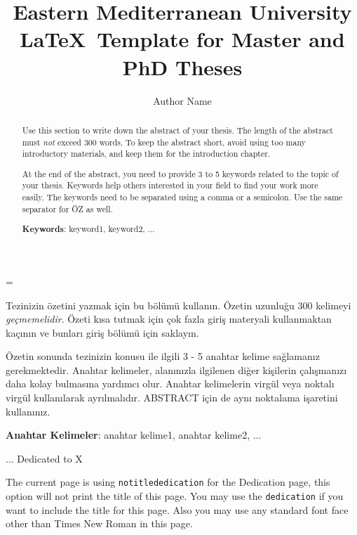 \documentclass[a4paper,12pt,oneside]{report}
\title{Eastern Mediterranean University \LaTeX~Template for Master and PhD Theses}
\author{Author Name}
\begin{document}

\emergencystretch=\maxdimen
{}

\makethesistitle 
\makeapprovalpage

\begin{abstract}
Use this section to write down the abstract of your thesis. The length of the abstract must \textit{not} exceed 300 words. To keep the abstract short, avoid using too many introductory materials, and keep them for the introduction chapter.

At the end of the abstract, you need to provide 3 to 5 keywords related to the topic of your thesis. Keywords help others interested in your field to find your work more easily. The keywords need to be separated using a comma or a semicolon. Use the same separator for ÖZ as well.

\noindent \textbf{Keywords}: keyword1, keyword2, ...
\end{abstract}

\begin{ozet}
Tezinizin özetini yazmak için bu bölümü kullanın. Özetin uzunluğu 300 kelimeyi \textit{geçmemelidir}. Özeti kısa tutmak için çok fazla giriş materyali kullanmaktan kaçının ve bunları giriş bölümü için saklayın.

Özetin sonunda tezinizin konusu ile ilgili 3 - 5 anahtar kelime sağlamanız gerekmektedir. Anahtar kelimeler, alanınızla ilgilenen diğer kişilerin çalışmanızı daha kolay bulmasına yardımcı olur. Anahtar kelimelerin virgül veya noktalı virgül kullanılarak ayrılmalıdır. ABSTRACT için de aynı noktalama işaretini kullanınız.
 
\noindent \textbf{Anahtar Kelimeler}: anahtar kelime1, anahtar kelime2, ...
\end{ozet}

\begin{notitlededication} %
\vspace{\fill} 
\begin{center}
{\calligra... Dedicated to X} %

The current page is using \texttt{notitlededication} for the Dedication page, this option will not print the title of this page. You may use the \texttt{dedication} if you want to include the title for this page. Also you may use any standard font face other than Times New Roman in this page.
\end{center}
\vspace{\fill}
\end{notitlededication}
\end{document}

